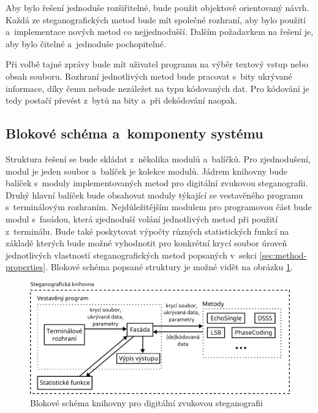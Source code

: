 Aby bylo řešení jednoduše rozšiřitelné, bude použit objektově orientovaný
návrh. Každá ze steganografických metod bude mít společné rozhraní, aby bylo
použití a~implementace nových metod co nejjednodušší. Dalším požadavkem na
řešení je, aby bylo čitelné a~jednoduše pochopitelné.

Při volbě tajné zprávy bude mít uživatel programu na výběr textový vstup nebo
obsah souboru. Rozhraní jednotlivých metod bude pracovat s~bity ukrývané
informace, díky čemu nebude nezáležet na typu kódovaných dat. Pro kódování je
tedy postačí převést z~bytů na bity a~při dekódování naopak.

\subsection*{Blokové schéma a~komponenty systému}
\label{sub:solution-components}

Struktura řešení se bude skládat z~několika modulů a~balíčků. Pro zjednodušení,
modul je jeden soubor a~balíček je kolekce modulů. Jádrem knihovny bude balíček
s~moduly implementovaných metod pro digitální zvukovou steganografii. Druhý
hlavní balíček bude obsahovat moduly týkající se vestavěného programu
s~terminálovým rozhraním. Nejdůležitějším modulem pro programovou část bude
modul s~fasádou, která zjednoduší volání jednotlivých metod při použití
z~terminálu. Bude také poskytovat výpočty různých statistických funkcí na
základě kterých bude možné vyhodnotit pro konkrétní krycí soubor úroveň
jednotlivých vlastností steganografických metod popsaných v~sekci
\ref{sec:method-properties}. Blokové schéma popsané struktury je možné vidět na
obrázku \ref{pic:library-block-diagram}.

\begin{figure}[hbt]
    \centering
    \includegraphics[width=\textwidth]{obrazky/block-diagram.pdf}
    \caption{Blokové schéma knihovny pro digitální zvukovou steganografii}
    \label{pic:library-block-diagram}
\end{figure}

